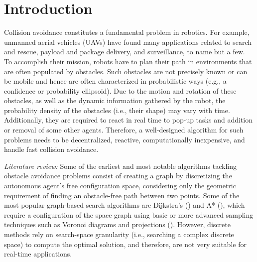 %







\section{Introduction}

Collision avoidance constitutes a fundamental problem in robotics.
For example, unmanned aerial vehicles (UAVs) have found many applications related to search and rescue, payload and package delivery, and surveillance, to name but a few. 
To accomplish their mission, robots have to plan their path in environments that are often populated by obstacles. Such obstacles are not precisely known or can be mobile and hence are often characterized in probabilistic ways (e.g., a confidence or probability ellipsoid). Due to the motion and rotation of these obstacles, as well as the dynamic information gathered by the robot, the probability density of the obstacles (i.e., their shape) may vary with time. Additionally, they are required to react in real time to pop-up tasks and addition or removal of some other agents. Therefore, a well-designed algorithm for such problems needs to be decentralized, reactive, computationally inexpensive, and handle fast collision avoidance.

\textit{Literature review:} 
Some of the earliest and most notable algorithms tackling obstacle avoidance problems consist of creating a graph by discretizing the autonomous agent’s free configuration space, considering only the geometric requirement of finding an obstacle-free path between two points. Some of the most popular graph-based search algorithms are Dijkstra’s (\cite{dijkstra1959note}) and
A* (\cite{hart1968formal,yang2004trajectory}), which require a configuration of the space graph using basic or more advanced sampling techniques such as Voronoi diagrams and projections (\cite{huttenlocher1993upper, aurenhammer1991voronoi}). However, discrete methods rely on search-space granularity (i.e., searching a complex discrete space) to compute the optimal solution, and therefore, are not very suitable for real-time applications.

